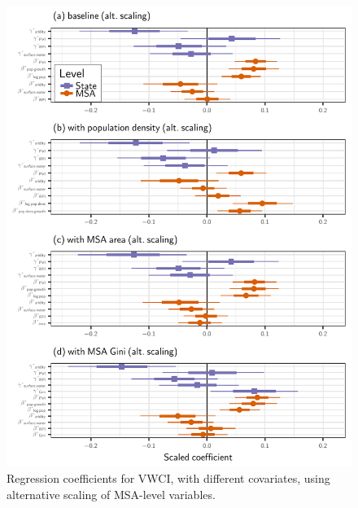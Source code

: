 \documentclass[draft]{agujournal}\usepackage{knitr}
\begin{document}
\begin{figure}
\includegraphics[width=6.25in]{figures_si/pooled_vwci_vars_cat_plots-1} \caption[Regression coefficients for VWCI, with different covariates, using alternative scaling of MSA-level variables]{Regression coefficients for VWCI, with different covariates, using alternative scaling of MSA-level variables.}\label{fig:pooled_vwci_vars_cat_plots}
\end{figure}



\end{document}
